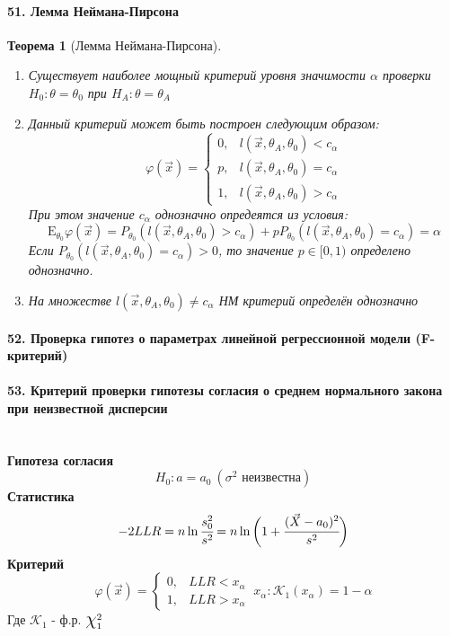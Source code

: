 \documentclass[titlepage]{article}
\newcommand{\sE}{\mathrm{E}}
\newcommand*{\bigchi}{\mbox{\Large$\chi$}} %
\newtheorem{theorem}{Теорема}
\begin{document}
\paragraph{51. Лемма Неймана-Пирсона}
\begin{theorem}[Лемма Неймана-Пирсона] ~\\
	\begin{enumerate}
		\item Существует наиболее мощный критерий уровня значимости $\alpha$ проверки $H_0: \theta = \theta_0$ при $H_A: \theta = \theta_A$
		\item Данный критерий может быть построен следующим образом:
		\[\varphi(\vec x) = \begin{cases}
			0, &l(\vec x, \theta_A, \theta_0) < c_\alpha \\
			p, &l(\vec x, \theta_A, \theta_0) = c_\alpha \\
			1, &l(\vec x, \theta_A, \theta_0) > c_\alpha
		\end{cases}\]
		При этом значение $c_\alpha$ однозначно опредеятся из условия:
		\[\sE_{\theta_0}\varphi(\vec x) = P_{\theta_0}(l(\vec x, \theta_A, \theta_0) > c_\alpha) + pP_{\theta_0}(l(\vec x, \theta_A, \theta_0) = c_\alpha) = \alpha\]
		Если $P_{\theta_0}(l(\vec x, \theta_A, \theta_0) = c_\alpha) > 0$, то значение $p \in [0,1)$ определено однозначно.
		\item На множестве $l(\vec x, \theta_A, \theta_0) \neq c_\alpha$ НМ критерий определён однозначно
	\end{enumerate}
\end{theorem}

\paragraph{52. Проверка гипотез о параметрах линейной регрессионной модели (F-критерий)}

\paragraph{53. Критерий проверки гипотезы согласия о среднем нормального закона при неизвестной дисперсии} ~\\
\textbf{Гипотеза согласия}
\[H_0: a = a_0\ (\sigma^2\text{ неизвестна})\]
\textbf{Статистика}
\[-2LLR = n\ln\cfrac{s_0^2}{s^2} = n\ln\bigg(1 + \cfrac{(\vec X - a_0)^2}{s^2}\bigg)\]
\textbf{Критерий}
\[\varphi(\vec x) = \begin{cases}
	0, &LLR < x_\alpha\\
	1, &LLR > x_\alpha
\end{cases}\ x_\alpha: \mathscr{K}_1(x_\alpha) = 1 - \alpha\]
Где $\mathscr{K}_1$ - ф.р. $\bigchi_1^2$
\end{document}

